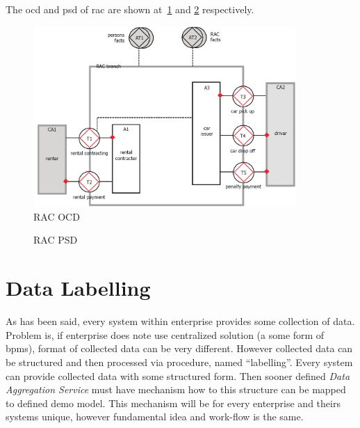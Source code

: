 The \gls{ocd} and \gls{psd} of \gls{rac} are shown at~\cref{fig:rac-ocd} and \cref{fig:rac-psd} respectively.
\begin{figure}[ht!]
\centering
\includegraphics[width=10cm,keepaspectratio]{img/rac-ocd}
\caption{RAC OCD}
\label{fig:rac-ocd}
\end{figure}

\begin{figure}[ht!]
 \centering
 \qquad
 \caption{RAC PSD}%
 \label{fig:rac-psd}%
\end{figure}
\newpage
\section{Data Labelling}
As has been said, every system within enterprise provides some collection of data. Problem is, if enterprise does note use centralized solution (a some form of \gls{bpms}), format of collected data can be very different. 
However collected data can be structured and then processed via procedure, named ``labelling''. Every system can provide collected data with some structured form. Then sooner defined \textit{Data Aggregation Service} must have mechanism how to this structure can be mapped to defined \gls{demo} model. This mechanism will be for every enterprise and theirs systems unique, however fundamental idea and work-flow is the same.

